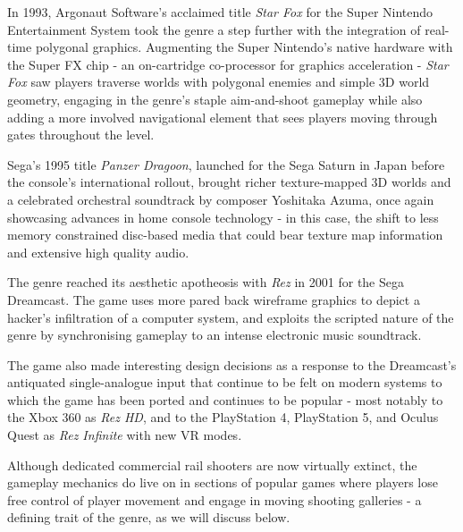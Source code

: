 \documentclass[11pt]{article}
\begin{document}
In 1993, Argonaut Software's acclaimed title \textit{Star Fox}\cite{star_fox} for the Super Nintendo Entertainment
System took the genre a step further with the integration of real-time polygonal graphics. Augmenting
the Super Nintendo's native hardware with the Super FX chip - an on-cartridge co-processor for graphics acceleration -
\textit{Star Fox} saw players traverse worlds with polygonal enemies and simple 3D world geometry,
engaging in the genre's staple aim-and-shoot gameplay while also adding a more involved navigational element that
sees players moving through gates throughout the level.

Sega's 1995 title \textit{Panzer Dragoon}\cite{panzer_dragoon}, launched for the Sega Saturn in Japan before 
the console's international rollout, brought richer texture-mapped 3D worlds and a celebrated orchestral
soundtrack by composer Yoshitaka Azuma, once again showcasing advances in home console technology - in this case, the
shift to less memory constrained disc-based media that could bear texture map information and extensive high quality
audio.

The genre reached its aesthetic apotheosis with \textit{Rez}\cite{rez} in 2001 for the Sega Dreamcast.
The game uses more pared back wireframe graphics to depict a hacker's infiltration of a computer system,
and exploits the scripted nature of the genre by synchronising gameplay to an intense electronic music soundtrack.

The game also made interesting design decisions as a response to the Dreamcast's antiquated
single-analogue input that continue to be felt on modern systems to which the game has been ported and
continues to be popular - most notably to the Xbox 360 as \textit{Rez HD}, and to the PlayStation 4,
PlayStation 5, and Oculus Quest as \textit{Rez Infinite} with new VR modes.

Although dedicated commercial rail shooters are now virtually extinct, the gameplay mechanics
do live on in sections of popular games where players lose free control of player movement
and engage in moving shooting galleries - a defining trait of the genre, as we will discuss below.
\end{document}
